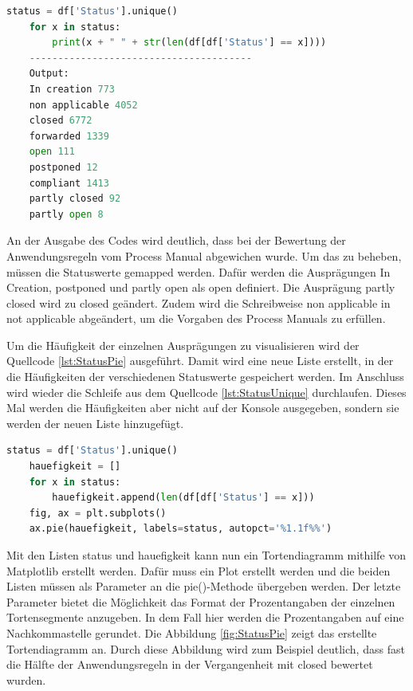 \begin{lstlisting}[language = python, caption={Häufigkeit der Ausprägungen von Status bestimmen},captionpos=b, label = lst:StatusUnique, floatplacement=H]
    status = df['Status'].unique()
    for x in status:
        print(x + " " + str(len(df[df['Status'] == x])))
    ---------------------------------------
    Output:
    In creation 773
    non applicable 4052
    closed 6772
    forwarded 1339
    open 111
    postponed 12
    compliant 1413
    partly closed 92
    partly open 8
\end{lstlisting}

An der Ausgabe des Codes wird deutlich, dass bei der Bewertung der Anwendungsregeln vom Process Manual abgewichen wurde. Um das zu beheben, müssen die Statuswerte gemapped werden.
Dafür werden die Ausprägungen \glqq In Creation\grqq{}, \glqq postponed\grqq{} und \glqq partly open\grqq{} als \glqq open\grqq{} definiert.
Die Ausprägung \glqq partly closed\grqq{} wird zu \glqq closed\grqq{} geändert. Zudem wird die Schreibweise \glqq non applicable\grqq{} in \glqq not applicable\grqq{} abgeändert,
um die Vorgaben des Process Manuals zu erfüllen. 

Um die Häufigkeit der einzelnen Ausprägungen zu visualisieren wird der Quellcode \ref*{lst:StatusPie} ausgeführt.
Damit wird eine neue Liste erstellt, in der die Häufigkeiten der verschiedenen Statuswerte gespeichert werden.
Im Anschluss wird wieder die Schleife aus dem Quellcode \ref*{lst:StatusUnique} durchlaufen. Dieses Mal werden die Häufigkeiten aber nicht auf der Konsole ausgegeben,
sondern sie werden der neuen Liste hinzugefügt.

\begin{lstlisting}[language = python, caption={Visualisierung des Attributs Status},captionpos=b, label = lst:StatusPie, floatplacement=H]
    status = df['Status'].unique()
    hauefigkeit = []
    for x in status:
        hauefigkeit.append(len(df[df['Status'] == x]))
    fig, ax = plt.subplots()
    ax.pie(hauefigkeit, labels=status, autopct='%1.1f%%')
\end{lstlisting}

Mit den Listen \glqq status\grqq{} und \glqq hauefigkeit\grqq{} kann nun ein Tortendiagramm mithilfe von Matplotlib erstellt werden.
Dafür muss ein Plot erstellt werden und die beiden Listen müssen als Parameter an die pie()-Methode übergeben werden.
Der letzte Parameter bietet die Möglichkeit das Format der Prozentangaben der einzelnen Tortensegmente anzugeben. In dem Fall hier werden die Prozentangaben auf eine Nachkommastelle
gerundet. Die Abbildung \ref*{fig:StatusPie} zeigt das erstellte Tortendiagramm an. Durch diese Abbildung wird zum Beispiel deutlich, dass fast die Hälfte der 
Anwendungsregeln in der Vergangenheit mit \glqq closed\grqq{} bewertet wurden.

